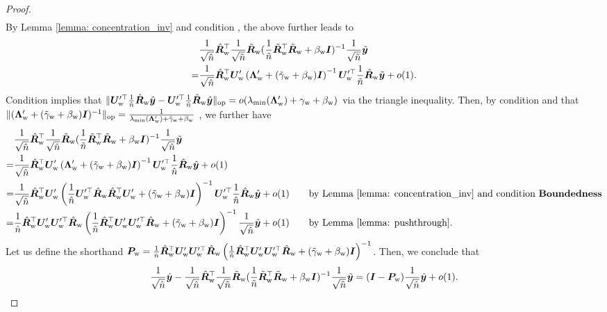 \begin{proof}
\begin{align}
\end{align}
By Lemma \ref{lemma: concentration_inv} and condition \bounded{},  the above further leads to
\begin{align}
\nonumber
& \frac{1}{\sqrt{\hat{n}}} \hat{{\bm{R}}}_{\text{w}}^\top  \frac{1}{\sqrt{\tilde{n}}}\tilde{{\bm{R}}}_{\text{w}} (\frac{1}{\tilde{n}}\tilde{{\bm{R}}}_{\text{w}}^\top \tilde{{\bm{R}}}_{\text{w}} + \beta_{\text{w}}{\bm{I}} )^{-1}\frac{1}{\sqrt{\tilde{n}}}\tilde{{\bm{y}}} \\
     \nonumber
     = & \frac{1}{\sqrt{\hat{n}}} \hat{{\bm{R}}}_{\text{w}}^\top {\bm{U}}_{\text{w}}' \left( {\bm{\Lambda}}_{\text{w}}' +(\tilde{\gamma}_{\text{w}}+ \beta_{\text{w}}){\bm{I}} \right)^{-1} {\bm{U}}_{\text{w}}'^\top \frac{1}{\tilde{n}} \tilde{{\bm{R}}}_{\text{w}} \tilde{{\bm{y}}} + o(1). 
\end{align}
Condition \conc{} implies that $\lVert  {\bm{U}}_{\text{w}}'^\top \frac{1}{\hat{n}} \hat{{\bm{R}}}_{\text{w}} \hat{{\bm{y}}} -{\bm{U}}_{\text{w}}'^\top \frac{1}{\hat{n}} \hat{{\bm{R}}}_{\text{w}} \hat{{\bm{y}}}   \rVert_{\mathrm{op}} = o( \lambda_{\min}({\bm{\Lambda}}_{\text{w}}')+\gamma_{\text{w}}+\beta_{\text{w}}) $ via the triangle inequality. Then, by condition \bounded{} and that $\lVert ({\bm{\Lambda}}_{\text{w}}'+(\tilde{\gamma}_{\text{w}}+ \beta_{\text{w}}){\bm{I}} )^{-1} \rVert_{\mathrm{op}} = \frac{1}{ \lambda_{\min}({\bm{\Lambda}}_{\text{w}}')+\tilde{\gamma}_{\text{w}}+\beta_{\text{w}}}$ , we further have
\begin{align}
\nonumber
& \frac{1}{\sqrt{\hat{n}}} \hat{{\bm{R}}}_{\text{w}}^\top  \frac{1}{\sqrt{\tilde{n}}}\tilde{{\bm{R}}}_{\text{w}} (\frac{1}{\tilde{n}}\tilde{{\bm{R}}}_{\text{w}}^\top \tilde{{\bm{R}}}_{\text{w}} + \beta_{\text{w}}{\bm{I}} )^{-1}\frac{1}{\sqrt{\tilde{n}}}\tilde{{\bm{y}}} \\
     \nonumber
     = & \frac{1}{\sqrt{\hat{n}}} \hat{{\bm{R}}}_{\text{w}}^\top {\bm{U}}_{\text{w}}' \left( {\bm{\Lambda}}_{\text{w}}'+(\tilde{\gamma}_{\text{w}}+ \beta_{\text{w}}){\bm{I}} \right)^{-1} {\bm{U}}_{\text{w}}'^\top \frac{1}{\hat{n}} \hat{{\bm{R}}}_{\text{w}} \hat{{\bm{y}}} + o(1)\\
     \nonumber
     = & \frac{1}{\sqrt{\hat{n}}} \hat{{\bm{R}}}_{\text{w}}^\top {\bm{U}}_{\text{w}}' \left( \frac{1}{\hat{n}} {\bm{U}}_{\text{w}}'^\top\hat{{\bm{R}}}_{\text{w}} \hat{{\bm{R}}}_{\text{w}}^\top {\bm{U}}_{\text{w}}'+(\tilde{\gamma}_{\text{w}}+ \beta_{\text{w}}){\bm{I}} \right)^{-1} {\bm{U}}_{\text{w}}'^\top \frac{1}{\hat{n}} \hat{{\bm{R}}}_{\text{w}} \hat{{\bm{y}}} + o(1) \quad\quad\text{by Lemma \ref{lemma: concentration_inv} and condition \textbf{Boundedness}{}} \\
     \nonumber
     = & \frac{1}{\hat{n}} \hat{{\bm{R}}}_{\text{w}}^\top {\bm{U}}_{\text{w}}' {\bm{U}}_{\text{w}}'^\top \hat{{\bm{R}}}_{\text{w}}\left(\frac{1}{\tilde{n}}  \hat{{\bm{R}}}_{\text{w}}^\top {\bm{U}}_{\text{w}}'{\bm{U}}_{\text{w}}'^\top\hat{{\bm{R}}}_{\text{w}}+(\tilde{\gamma}_{\text{w}}+ \beta_{\text{w}}){\bm{I}} \right)^{-1}  \frac{1}{\sqrt
     {\hat{n}}}\hat{{\bm{y}}} + o(1) \quad\quad \text{by Lemma \ref{lemma: pushthrough}}.
\end{align}
Let us define the shorthand ${\bm{P}}_{\text{w}} = \frac{1}{\hat{n}} \hat{{\bm{R}}}_{\text{w}}^\top {\bm{U}}_{\text{w}}' {\bm{U}}_{\text{w}}'^\top \hat{{\bm{R}}}_{\text{w}}\left(\frac{1}{\tilde{n}}  \hat{{\bm{R}}}_{\text{w}}^\top {\bm{U}}_{\text{w}}'{\bm{U}}_{\text{w}}'^\top\hat{{\bm{R}}}_{\text{w}}+(\tilde{\gamma}_{\text{w}}+ \beta_{\text{w}}){\bm{I}} \right)^{-1} $. Then, we conclude that
\begin{align}
    \nonumber
    \frac{1}{\sqrt{\hat{n}}}\hat{{\bm{y}}}-   \frac{1}{\sqrt{\hat{n}}} \hat{{\bm{R}}}_{\text{w}}^\top  \frac{1}{\sqrt{\tilde{n}}}\tilde{{\bm{R}}}_{\text{w}} (\frac{1}{\tilde{n}}\tilde{{\bm{R}}}_{\text{w}}^\top \tilde{{\bm{R}}}_{\text{w}} + \beta_{\text{w}}{\bm{I}} )^{-1}\frac{1}{\sqrt{\tilde{n}}}\tilde{{\bm{y}}} = ({\bm{I}} -{\bm{P}}_{\text{w}} )\frac{1}{\sqrt{\hat{n}}}\hat{{\bm{y}}} + o(1).
\end{align}
\end{proof}


